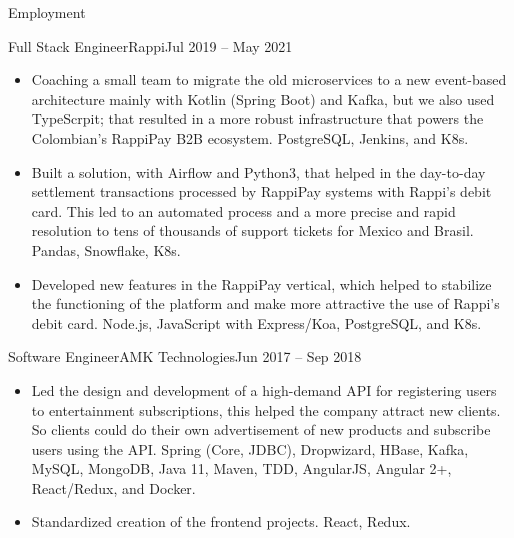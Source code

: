 \documentclass[calibri]{../macdowell-cv/mcdowellcv}
\begin{document}
\begin{cvsection}{Employment}
		\begin{cvsubsection}{Full Stack Engineer}{Rappi}{Jul 2019 -- May 2021}
			\begin{itemize}
				\item Coaching a small team to migrate the old microservices to a new event-based architecture mainly with Kotlin (Spring Boot) and Kafka, but we also used TypeScrpit; that resulted in a more robust infrastructure that powers the Colombian's RappiPay B2B ecosystem. PostgreSQL, Jenkins, and K8s.
				\item Built a solution, with Airflow and Python3, that helped in the day-to-day settlement transactions processed by RappiPay systems with Rappi's debit card. This led to an automated process and a more precise and rapid resolution to tens of thousands of support tickets for Mexico and Brasil. Pandas, Snowflake, K8s.
				\item Developed new features in the RappiPay vertical, which helped to stabilize the functioning of the platform and make more attractive the use of Rappi's debit card. Node.js, JavaScript with Express/Koa, PostgreSQL, and K8s.
			\end{itemize}
		\end{cvsubsection}

		\begin{cvsubsection}{Software Engineer}{AMK Technologies}{Jun 2017 -- Sep 2018}
			\begin{itemize}
				\item Led the design and development of a high-demand API for registering users to entertainment subscriptions, this helped the company attract new clients. So clients could do their own advertisement of new products and subscribe users using the API. Spring (Core, JDBC), Dropwizard, HBase, Kafka, MySQL, MongoDB, Java 11, Maven, TDD, AngularJS, Angular 2+, React/Redux, and Docker.
				\item Standardized creation of the frontend projects. React, Redux.
			\end{itemize}
		\end{cvsubsection}


\end{cvsection}
\end{document}
